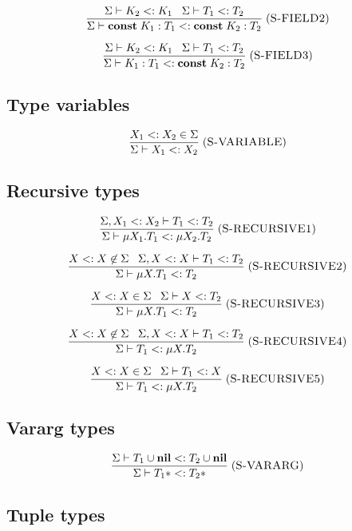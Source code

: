 \documentclass[12pt]{article}
\newcommand{\Nil}{\mathbf{nil}}
\newcommand{\Const}{\mathbf{const}}
\newcommand{\mylabel}[1]{\; (\textsc{#1})}
\newcommand{\subtype}{<:}
\newcommand{\senv}{\Sigma}
\begin{document}
\[
\frac{\senv \vdash K_{2} \subtype K_{1} \;\;\;
      \senv \vdash T_{1} \subtype T_{2}}
     {\senv \vdash \Const \; K_{1}:T_{1} \subtype \Const \; K_{2}:T_{2}}
\mylabel{S-FIELD2}
\]

\[
\frac{\senv \vdash K_{2} \subtype K_{1} \;\;\;
      \senv \vdash T_{1} \subtype T_{2}}
     {\senv \vdash K_{1}:T_{1} \subtype \Const \; K_{2}:T_{2}}
\mylabel{S-FIELD3}
\]

\subsection{Type variables}

\[
\frac{X_{1} \subtype X_{2} \in \senv}
     {\senv \vdash X_{1} \subtype X_{2}}
\mylabel{S-VARIABLE}
\]

\subsection{Recursive types}

\[
\frac{\senv, X_{1} \subtype X_{2} \vdash T_{1} \subtype T_{2}}
     {\senv \vdash \mu X_{1}.T_{1} \subtype \mu X_{2}.T_{2}}
\mylabel{S-RECURSIVE1}
\]

\[
\frac{X \subtype X \not\in \senv \;\;\;
      \senv, X \subtype X \vdash T_{1} \subtype T_{2}}
     {\senv \vdash \mu X.T_{1} \subtype T_{2}}
\mylabel{S-RECURSIVE2}
\]

\[
\frac{X \subtype X \in \senv \;\;\;
      \senv \vdash X \subtype T_{2}}
     {\senv \vdash \mu X.T_{1} \subtype T_{2}}
\mylabel{S-RECURSIVE3}
\]

\[
\frac{X \subtype X \not\in \senv \;\;\;
      \senv, X \subtype X \vdash T_{1} \subtype T_{2}}
     {\senv \vdash T_{1} \subtype \mu X.T_{2}}
\mylabel{S-RECURSIVE4}
\]

\[
\frac{X \subtype X \in \senv \;\;\;
      \senv \vdash T_{1} \subtype X}
     {\senv \vdash T_{1} \subtype \mu X.T_{2}}
\mylabel{S-RECURSIVE5}
\]

\subsection{Vararg types}

\[
\frac{\senv \vdash T_{1} \cup \Nil \subtype T_{2} \cup \Nil}
     {\senv \vdash T_{1}* \subtype T_{2}*}
\mylabel{S-VARARG}
\]

\subsection{Tuple types}
\end{document}
